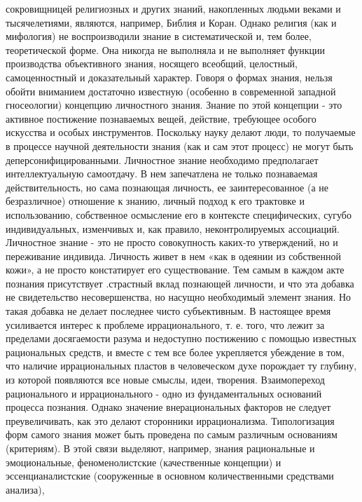 \documentclass[12pt]{article}
\begin{document}
сокровищницей  религиозных  и  других  знаний,  накопленных  людьми  веками  и  тысячелетиями,  являются,
например, Библия и Коран. Однако религия (как и мифология) не воспроизводили знание в систематической и,
тем  более,  теоретической  форме.  Она  никогда  не  выполняла  и  не  выполняет  функции  производства
объективного знания, носящего всеобщий, целостный, самоценностный и доказательный характер.
Говоря о формах знания, нельзя обойти вниманием достаточно известную (особенно в современной западной
гносеологии)  концепцию  личностного  знания.  Знание  по  этой  концепции  -  это  активное  постижение
познаваемых вещей, действие, требующее особого искусства и особых инструментов. Поскольку науку делают
люди,  то  получаемые  в  процессе  научной  деятельности  знания  (как  и  сам  этот  процесс)  не  могут  быть
деперсонифицированными. Личностное знание необходимо предполагает интеллектуальную самоотдачу. В нем
запечатлена не только познаваемая действительность, но сама познающая личность, ее заинтересованное (а не
безразличное) отношение к знанию, личный подход к его трактовке и использованию, собственное осмысление
его  в  контексте  специфических,  сугубо  индивидуальных,  изменчивых  и,  как  правило,  неконтролируемых
ассоциаций.
Личностное знание - это не просто совокупность каких-то утверждений, но и переживание индивида. Личность
живет в нем «как в одеянии из собственной кожи», а не просто констатирует его существование. Тем самым в
каждом акте познания присутствует .страстный вклад познающей личности, и что эта добавка не свидетельство
несовершенства,  но  насущно  необходимый  элемент  знания.  Но  такая  добавка  не  делает  последнее  чисто
субъективным.
В  настоящее  время усиливается  интерес к  проблеме  иррационального, т. е.  того, что лежит  за  пределами
досягаемости разума и недоступно постижению с помощью известных рациональных средств, и вместе с тем
все более укрепляется убеждение в том, что наличие иррациональных пластов в человеческом духе порождает
ту  глубину,  из  которой  появляются  все  новые  смыслы,  идеи,  творения.  Взаимопереход  рационального  и
иррационального - одно из фундаментальных оснований процесса познания. Однако значение внерациональных
факторов не следует преувеличивать, как это делают сторонники иррационализма.
Типологизация форм самого знания может быть проведена по самым различным основаниям (критериям). В
этой связи выделяют,  например,  знания рациональные и  эмоциональные, феноменолистские  (качественные
концепции)  и  эссенцианалистские  (сооруженные  в  основном  количественными  средствами  анализа),
\end{document}
